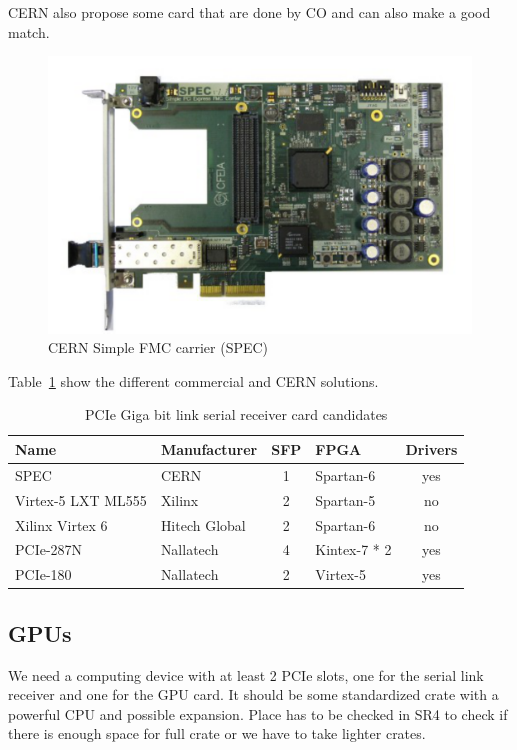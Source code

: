 \gls{CERN} also propose some card that are done by \gls{CO} and can also make a good match.

\begin{figure}[H]
\caption{CERN Simple FMC carrier (SPEC)}
\label{fig:spec}
\centering
\includegraphics[scale=0.3]{spec_top.pdf}
\end{figure}

Table~\ref{tab:receiver_cards} show the different commercial and CERN solutions.

\begin{table}[H]
\caption{PCIe Giga bit link serial receiver card candidates}
\label{tab:receiver_cards}
\centering
\begin{tabular}{|ll|c|l|c|}
\hline
Name & Manufacturer & SFP & FPGA & Drivers \\
\hline
\hline
SPEC & CERN & 1 & Spartan-6 & yes \\
\hline
Virtex-5 LXT ML555 & Xilinx & 2 & Spartan-5 & no \\
\hline
Xilinx Virtex 6 & Hitech Global & 2 & Spartan-6 & no \\
\hline		
PCIe-287N & Nallatech & 4 & Kintex-7 * 2 & yes \\		
PCIe-180 & Nallatech & 2 & Virtex-5 & yes \\
\hline
\end{tabular}
\end{table}

\subsection{GPUs}

We need a computing device with at least 2 PCIe slots, one for the serial link receiver and one for the \gls{GPU} card. It should be some standardized crate with a powerful \gls{CPU} and possible expansion. Place has to be checked in SR4 to check if there is enough space for full crate or we have to take lighter crates.

